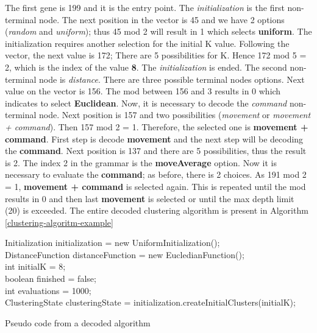 \documentclass[journal]{IEEEtran}
\begin{document}
	The first gene is 199 and it is the entry point. The \textit{initialization} is the first non-terminal node. The next position in the vector is 45 and we have 2 options (\textit{random} and \textit{uniform}); thus 45 mod 2 will result in 1 which selects \textbf{uniform}. The initialization requires another selection for the initial K value. Following the vector, the next value is 172; There are 5 possibilities for K. Hence 172 mod 5 = 2, which is the index of the value \textbf{8}. The \textit{initialization} is ended. The second non-terminal node is \textit{distance}. There are three possible terminal nodes options. Next value on the vector is 156. The mod between 156 and 3 results in 0 which indicates to select \textbf{Euclidean}. Now, it is necessary to decode the \textit{command} non-terminal node. Next position is 157 and two possibilities (\textit{movement} or \textit{movement + command}). Then 157 mod 2 = 1. Therefore, the selected one is \textbf{movement + command}. First step is decode \textbf{movement} and the next step will be decoding the \textbf{command}. Next position is 137 and there are 5 possibilities, thus the result is 2. The index 2 in the grammar is the \textbf{moveAverage} option. Now it is necessary to evaluate the \textbf{command}; as before, there is 2 choices. As 191 mod 2 = 1, \textbf{movement + command} is selected again. This is repeated until the mod results in 0 and then last \textbf{movement} is selected or until the max depth limit (20) is exceeded. The entire decoded clustering algorithm is present in Algorithm \ref{clustering-algoritm-example}
	
	\begin{algorithm}[!htb]
		\label{clustering-algoritm-example}
		Initialization initialization = new UniformInitialization(); \\
		DistanceFunction distanceFunction = new EucledianFunction(); \\
		int initialK = 8; \\
		boolean finished = false; \\
		int evaluations = 1000;\\
		ClusteringState 
		clusteringState = initialization.createInitialClusters(initialK); \\
		\caption{Pseudo code from a decoded algorithm}
	\end{algorithm}
	
\end{document}
